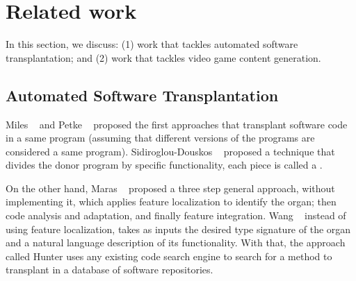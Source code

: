 \section{Related work} 
\label{sec:Related}

In this section, we discuss: (1) work that tackles automated software transplantation; and (2) work that tackles video game content generation.

\subsection{Automated Software Transplantation}

Miles \etal~\cite{miles2012situ} and Petke \etal~\cite{petke2014using} proposed the first approaches that transplant software code in a same program (assuming that different versions of the programs are considered a same program). 
Sidiroglou-Douskos \etal~\cite{sidiroglou2015horizontal} proposed a technique that divides the donor program by specific functionality, each piece is called a . 

On the other hand, Maras \etal~\cite{maras2015towards} proposed a three step general approach, without implementing it, which applies feature localization to identify the organ; then code analysis and adaptation, and finally feature integration. Wang \etal~\cite{wang2016hunter} instead of using feature localization, takes as inputs the desired type signature of the organ and a natural language description of its functionality. With that, the approach called Hunter uses any existing code search engine to search for a method to transplant in a database of software repositories. 

